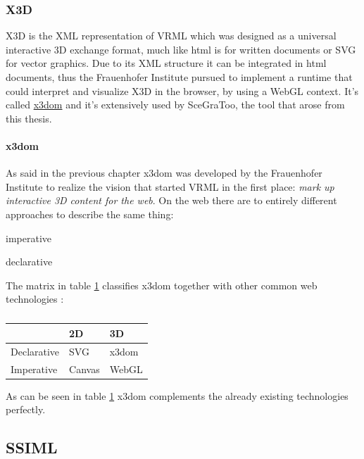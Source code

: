 \subsubsection{X3D}\label{x3d}

X3D is the XML representation of VRML which was designed as
a universal interactive 3D exchange format, much like html is for
written documents or \gls{SVG} for vector graphics. Due to its XML structure
it can be integrated in html documents, thus the Frauenhofer Institute
pursued to implement a runtime that could interpret and visualize X3D in
the browser, by using a WebGL context. It's called
\href{http://www.x3dom.org/}{x3dom} and it's extensively used by
SceGraToo, the tool that arose from this thesis.

\paragraph{x3dom}
\label{par:x3dom}

As said in the previous chapter x3dom was developed by the Frauenhofer
Institute to realize the vision that started VRML in the first place:
\emph{mark up interactive 3D content for the web}. On the web there are
to entirely different approaches to describe the same thing:
\begin{itemize*}
  \item imperative
  \item declarative
\end{itemize*}

The matrix in table \ref{tab:feature_matrix} classifies x3dom together with other common web
technologies \cite{x3dom}:

\begin{table}[H]
  \begin{longtable}[c]{@{}lll@{}}
  \toprule
  & 2D & 3D\tabularnewline
  \midrule
  \endhead
  Declarative & \gls{SVG} \cite{svg} & x3dom \cite{x3dom} \tabularnewline
  Imperative  & Canvas \cite{canvas} & WebGL \cite{webgl} \tabularnewline
  \bottomrule
  \end{longtable}
  \caption{\cite{x3dom}}
  \label{tab:feature_matrix}
\end{table}

As can be seen in table \ref{tab:feature_matrix} x3dom complements the already existing technologies
perfectly.

\subsection{SSIML}
\label{ssiml}

